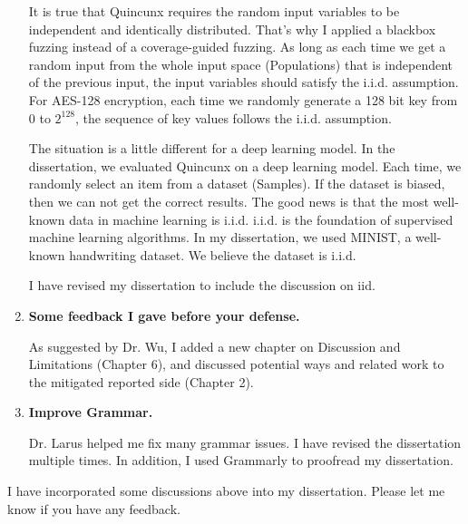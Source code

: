\documentclass{article}
\begin{document}
\begin{enumerate}
It is true that Quincunx requires the random input variables to be independent and identically distributed. That's why I applied a blackbox fuzzing instead of a coverage-guided fuzzing. As long as each time we get a random input from the whole input space (Populations) that is independent of the previous input, the input variables should satisfy the i.i.d. assumption. For AES-128 encryption, each time we randomly generate a 128 bit key from $0$ to $2^{128}$, the sequence of key values follows the i.i.d. assumption.

The situation is a little different for a deep learning model. In the dissertation, we evaluated Quincunx on a deep learning model. Each time, we randomly select an item from a dataset (Samples). If the dataset is biased, then we can not get the correct results. The good news is that the most well-known data in machine learning is i.i.d. i.i.d. is the foundation of supervised machine learning algorithms. In my dissertation, we used MINIST, a well-known handwriting dataset. We believe the dataset is i.i.d.

I have revised my dissertation to include the discussion on iid.


\item \textbf{Some feedback I gave before your defense.}

As suggested by Dr. Wu, I added a new chapter on Discussion and Limitations (Chapter 6), and discussed potential ways and related work to the mitigated reported side (Chapter 2).

\item \textbf{Improve Grammar.}

Dr. Larus helped me fix many grammar issues. I have revised the dissertation multiple times. In addition, I used Grammarly to proofread my dissertation.
\end{enumerate}

I have incorporated some discussions above into my dissertation. Please let me know if you have any feedback.
\end{document}
